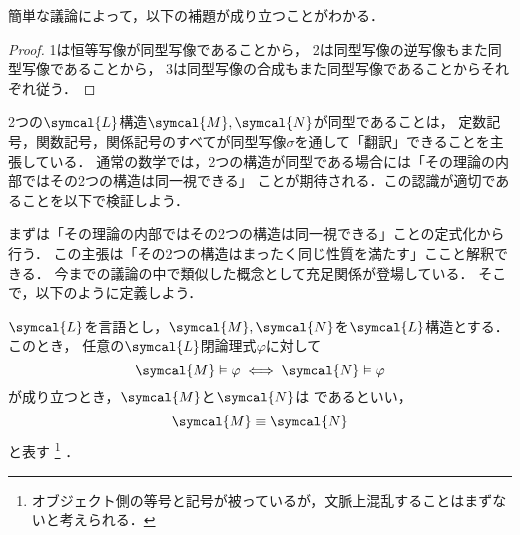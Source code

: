 簡単な議論によって，以下の補題が成り立つことがわかる．


\begin{proof}
	1は恒等写像が同型写像であることから，
	2は同型写像の逆写像もまた同型写像であることから，
	3は同型写像の合成もまた同型写像であることからそれぞれ従う．
\end{proof}

2つの\(\symcal{L}\)構造\(\symcal{M}, \symcal{N}\)が同型であることは，
定数記号，関数記号，関係記号のすべてが同型写像\(\sigma\)を通して「翻訳」できることを主張している．
通常の数学では，2つの構造が同型である場合には「その理論の内部ではその2つの構造は同一視できる」
ことが期待される．この認識が適切であることを以下で検証しよう．

まずは「その理論の内部ではその2つの構造は同一視できる」ことの定式化から行う．
この主張は「その2つの構造はまったく同じ性質を満たす」ここと解釈できる．
今までの議論の中で類似した概念として充足関係が登場している．
そこで，以下のように定義しよう．

\begin{Def} \label{Def:elementarilyequivalent}
	\(\symcal{L}\)を言語とし，\(\symcal{M}, \symcal{N}\)を\(\symcal{L}\)構造とする．
	このとき，
	任意の\(\symcal{L}\)閉論理式\(\varphi\)に対して
	\begin{equation}
		\symcal{M} \satisfy \varphi \metaequivalent \symcal{N} \satisfy \varphi
		\label{eq:elementarilyequivalentcondition}
	\end{equation}
	が成り立つとき，\(\symcal{M}\)と\(\symcal{N}\)は
	であるといい，%
	\begin{equation}
		\symcal{M} \elementarilyequivalent \symcal{N}
		\label{eq:elementarilyequivalent}
	\end{equation}
	と表す%
	\footnote{%
		オブジェクト側の等号と記号が被っているが，文脈上混乱することはまずないと考えられる．
	}%
	．
\end{Def}

